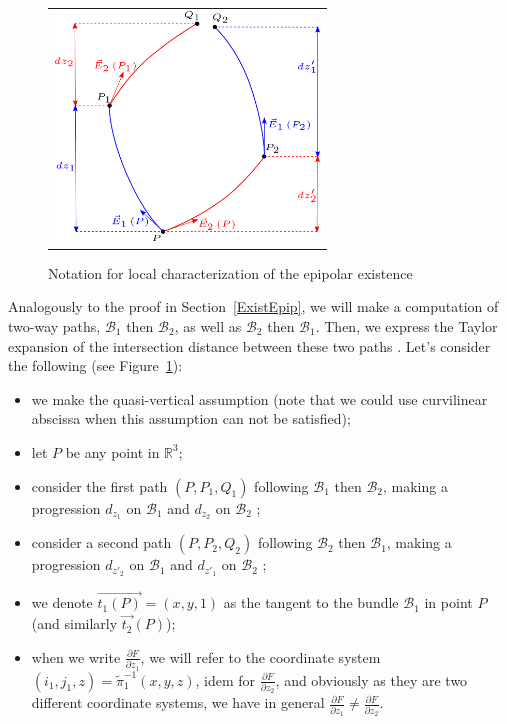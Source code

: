 \documentclass{ipol}
\newcommand{\RR}{\ensuremath{\mathbb{R}}}
\newcommand{\Bund}[1]{\ensuremath{\mathcal{B}_{#1}}}
\newcommand{\BundO}{\Bund{1}}
\newcommand{\BundT}{\Bund{2}}
\newcommand{\PiVert}{\widetilde{\pi}}
\newcommand{\DerPart}[2]{\frac{\partial #1}{\partial #2}}
\begin{document}
\begin{figure}
\centering
\begin{tabular}{c}
\includegraphics[width=7cm]{FIGS/EquadifEpip.png}
\end{tabular}
\caption{Notation for local characterization of the epipolar existence}
\label{EqDifEpip}
\end{figure}

Analogously to the proof in Section~\ref{ExistEpip}, we will make a  computation of two-way paths, $\BundO$ then $\BundT$,
as well as $\BundT$ then   $\BundO$. Then, we express the Taylor expansion
of the intersection distance between these two paths  
. Let's consider the following (see Figure~\ref{EqDifEpip}):
\begin{itemize}
   \item we make the quasi-vertical assumption (note that we could use
          curvilinear abscissa   when this assumption can not  be satisfied);
   \item let $P$ be any point in $\RR^3$;
   \item consider the first path $(P,P_1,Q_1)$ following  $\BundO$ then $\BundT$, making a
         progression $d_{z_1}$ on $\BundO$ and  $d_{z_2}$ on $\BundT$ ;
   \item consider a second path $(P,P_2,Q_2)$ following  $\BundT$ then $\BundO$, making a
         progression $d_{z'_2}$ on $\BundO$ and  $d_{z'_1}$ on $\BundT$ ;
   \item we denote $\overrightarrow{t_1(P)}=(x,y,1)$ as the tangent to the bundle  $\BundO$  in point $P$
         (and similarly $\overrightarrow{t_2}(P)$);
   \item when we write  $\DerPart{F}{z_1}$, we will refer to the coordinate system $(i_1,j_1,z) = \PiVert_1^{-1}(x,y,z)$,
         idem for  $\DerPart{F}{z_2}$, and obviously as they are two different coordinate systems, we have in general
        $\DerPart{F}{z_1}  \neq \DerPart{F}{z_2}$.
\end{itemize}
\end{document}
